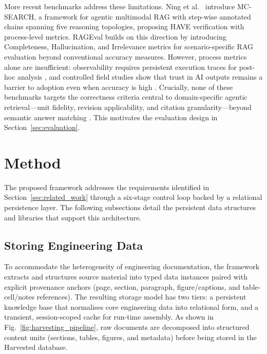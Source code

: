\documentclass[largeformat]{interact}
\begin{document}
More recent benchmarks address these limitations. Ning et al.~\cite{ning2026mcsearch} introduce MC-SEARCH, a framework for agentic multimodal RAG with step-wise annotated chains spanning five reasoning topologies, proposing HAVE verification with process-level metrics. RAGEval \cite{zhu2025rageval} builds on this direction by introducing Completeness, Hallucination, and Irrelevance metrics for scenario-specific RAG evaluation beyond conventional accuracy measures. However, process metrics alone are insufficient: observability requires persistent execution traces for post-hoc analysis \cite{moshkovich2025agentic}, and controlled field studies show that trust in AI outputs remains a barrier to adoption even when accuracy is high \cite{lowhagen2025aiassistant}. Crucially, none of these benchmarks targets the correctness criteria central to domain-specific agentic retrieval---unit fidelity, revision applicability, and citation granularity---beyond semantic answer matching \cite{jafari2025measurement}. This motivates the evaluation design in Section~\ref{sec:evaluation}.

\section{Method}
\label{sec:Method}
The proposed framework addresses the requirements identified in Section~\ref{sec:related_work} through a six-stage control loop backed by a relational persistence layer. The following subsections detail the persistent data structures and libraries that support this architecture.

\subsection{Storing Engineering Data}
\label{subsec:storing_engineering_data}
To accommodate the heterogeneity of engineering documentation, the framework extracts and structures source material into typed data instances paired with explicit provenance anchors (page, section, paragraph, figure/captions, and table-cell/notes references). The resulting storage model has two tiers: a persistent knowledge base that normalises core engineering data into relational form, and a transient, session-scoped cache for run-time assembly. As shown in Fig.~\ref{fig:harvesting_pipeline}, raw documents are decomposed into structured content units (sections, tables, figures, and metadata) before being stored in the Harvested database.
 
\end{document}
